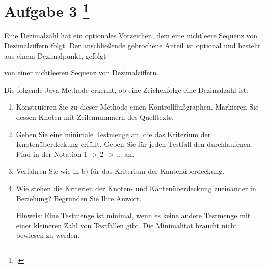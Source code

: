 \documentclass{lehramt-informatik-aufgabe}
\begin{document}
\section{Aufgabe 3
\footcite{examen:66116:2019:09}}

Eine Dezimalzahl hat ein optionales Vorzeichen, dem eine nichtleere
Sequenz von Dezimalziffern folgt. Der anschließende gebrochene Anteil
ist optional und besteht aus einem Dezimalpunkt, gefolgt

von einer nichtleeren Sequenz von Dezimalziffern.

Die folgende Java-Methode erkennt, ob eine Zeichenfolge eine Dezimalzahl
ist:


\begin{enumerate}


\item Konstruieren Sie zu dieser Methode einen Kontrollflußgraphen.
Markieren Sie dessen Knoten mit Zeilennummern des Quelltexts.


\item Geben Sie eine minimale Testmenge an, die das Kriterium der
Knotenüberdeckung erfüllt. Geben Sie für jeden Testfall den
durchlaufenen Pfad in der Notation 1 -> 2 -> ... an.


\item Verfahren Sie wie in b) für das Kriterium der Kantenüberdeckung.


\item Wie stehen die Kriterien der Knoten- und Kantenüberdeckung
zueinander in Beziehung? Begründen Sie Ihre Anwort.

Hinweis: Eine Testmenge ist minimal, wenn es keine andere Testmenge mit
einer kleineren Zahl von Testfällen gibt. Die Minimalität braucht nicht
bewiesen zu werden.

\end{enumerate}
\end{document}
